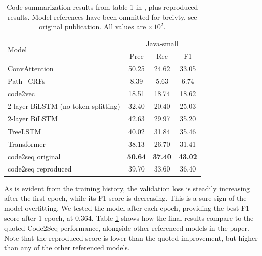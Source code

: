 \documentclass{article} %
\begin{document}
\setlength{\tabcolsep}{15pt}
\renewcommand{\arraystretch}{1.0}
\begin{table}[hbt!]
    \captionsetup{justification=centering}
    \caption{Code summarization results from table 1 in \cite{alon2019}, plus reproduced results. Model references have been ommitted for breivty, see original publication. All values are $\times10^2$.}
    \label{tab:results}
    \begin{center}
    \begin{tabular}{lccc}
        \hline
        \multirow{2}{*}{Model} & \multicolumn{3}{c}{Java-small}\\
        \cline{2-4}
        & Prec & Rec & F1\\
        \hline
        ConvAttention                       & 50.25 & 24.62 & 33.05\\
        Path+CRFs                           & 8.39  & 5.63  & 6.74 \\
        code2vec                            & 18.51 & 18.74 & 18.62\\
        2-layer BiLSTM (no token splitting) & 32.40 & 20.40 & 25.03\\
        2-layer BiLSTM                      & 42.63 & 29.97 & 35.20\\
        TreeLSTM                            & 40.02 & 31.84 & 35.46\\
        Transformer                         & 38.13 & 26.70 & 31.41\\
        \hline
        code2seq original & \textbf{50.64} & \textbf{37.40} & \textbf{43.02}\\
        code2seq reproduced                 & 39.70 & 33.60 & 36.40\\
        \hline
    \end{tabular}
    \end{center}
\end{table}

As is evident from the training history, the validation loss is steadily increasing after the first epoch, while its F1 score is decreasing. This is a sure sign of the model overfitting. We tested the model after each epoch, providing the best F1 score after 1 epoch, at $0.364$. Table \ref{tab:results} shows how the final results compare to the quoted Code2Seq performance, alongside other referenced models in the paper. Note that the reproduced score is lower than the quoted improvement, but higher than any of the other referenced models. 
\end{document}
